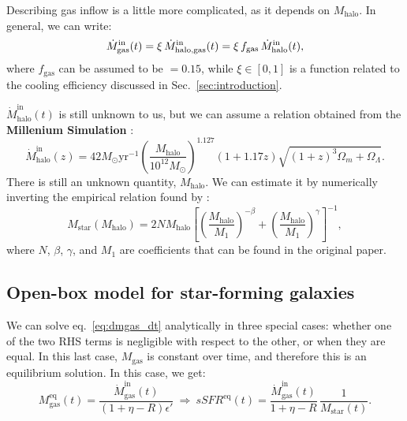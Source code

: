 \documentclass[fleqn,usenatbib]{mnras}
\begin{document}
Describing gas inflow is a little more complicated, as it depends on $M_\text{halo}$. In general, we can write:
\begin{equation}
    \dot{M}_\text{gas}^\text{in}(t) = \xi \, \dot{M}_\text{halo,\rm gas}^\text{in}(t) = \xi \, f_\text{gas} \, \dot{M}_\text{halo}^\text{in}(t),
	\label{eq:mdotin}
\end{equation}
where $f_\text{gas}$ can be assumed to be $=0.15$, while $\xi \in [0,1]$ is a function related to the cooling efficiency discussed in Sec.~\ref{sec:introduction}. 

$\dot{M}_\text{halo}^\text{in}(t)$ is still unknown to us, but we can assume a relation obtained from the \textbf{Millenium Simulation} \citep{McBride_2009}:
{\fontsize{7.9pt}{7.9pt}\begin{equation}
    \dot{M}_\text{halo}^\text{in}(z) = 42 M_{\odot} \text{yr}^{-1} \left(\dfrac{M_\text{halo}}{10^{12}M_{\odot}}\right)^{1.127} (1+1.17z) \sqrt{(1+z)^3 \Omega_m + \Omega_\Lambda}.
	\label{eq:mcbride}
\end{equation}}
There is still an unknown quantity, $M_\text{halo}$. We can estimate it by numerically inverting the empirical relation found by \citet{Moster_2012}:
\begin{equation}
    M_\text{star} \left(M_\text{halo}\right) = 2N M_\text{halo} \left[\left(\dfrac{M_\text{halo}}{M_1}\right)^{-\beta} + \left(\dfrac{M_\text{halo}}{M_1}\right)^\gamma\right]^{-1},
	\label{eq:moster}
\end{equation}
where $N$, $\beta$, $\gamma$, and $M_1$ are coefficients that can be found in the original paper.


\subsection{Open-box model for star-forming galaxies}\label{sec:open_box}
We can solve eq.~\ref{eq:dmgas_dt} analytically in three special cases: whether one of the two RHS terms is negligible with respect to the other, or when they are equal. In this last case, $M_\text{gas}$ is constant over time, and therefore this is an equilibrium solution. In this case, we get:
{\fontsize{8.2pt}{8.2pt}\begin{equation}
    M^\text{eq}_\text{gas}(t) = \dfrac{\dot{M}_\text{gas}^\text{in}(t)}{(1+\eta-R)\epsilon'} \: \Rightarrow \: sSFR^\text{eq}(t) = \dfrac{\dot{M}_\text{gas}^\text{in}(t)}{1+\eta-R} \, \dfrac{1}{M_\text{star}(t)}.
	\label{eq:openbox_equilibrium}
\end{equation}}
\end{document}
